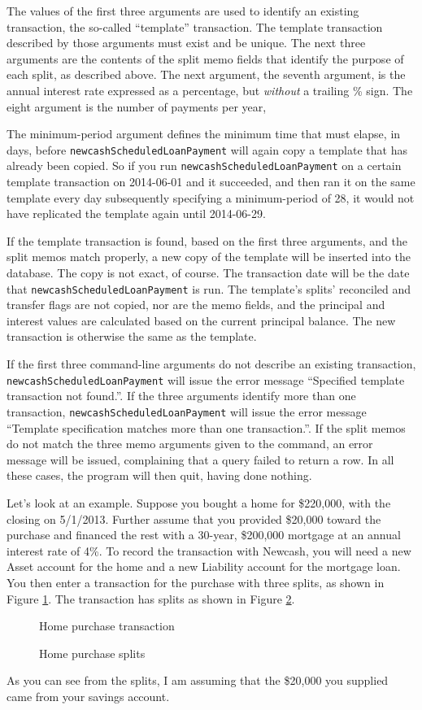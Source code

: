 \documentclass{report}
\newcommand{\graphicsfig}[5]{
\begin{figure}[#5]
\begin{center}
\resizebox{#1}{!}{\texttt{[image: \#2]}}
\end{center}
\caption{#3}
\label{#4}
\end{figure}
}
\begin{document}
The values of the first three arguments are used to identify an existing transaction, the so-called ``template'' transaction. The template transaction described by those arguments must exist and be unique. The next three arguments are the contents of the split memo fields that identify the purpose of each split, as described above. The next argument, the seventh argument, is the annual interest rate expressed as a percentage, but \emph{without} a trailing \% sign. The eight argument is the number of payments per year,

The minimum-period argument defines the minimum time that must elapse, in days, before \verb|newcashScheduledLoanPayment| will again copy a template that has already been copied. So if you run \verb|newcashScheduledLoanPayment| on a certain template transaction on 2014-06-01 and it succeeded, and then ran it on the same template every day subsequently specifying a minimum-period of 28, it would not have replicated the template again until 2014-06-29.

If the template transaction is found, based on the first three arguments, and the split memos match properly, a new copy of the template will be inserted into the database. The copy is not exact, of course. The transaction date will be the date that \verb|newcashScheduledLoanPayment| is run. The template's splits' reconciled and transfer flags are not copied, nor are the memo fields, and the principal and interest values are calculated based on the current principal balance. The new transaction is otherwise the same as the template.

If the first three command-line arguments do not describe an existing transaction, \verb|newcashScheduledLoanPayment| will issue the error message ``Specified template transaction not found.''. If the three arguments identify more than one transaction, \verb|newcashScheduledLoanPayment| will issue the error message ``Template specification matches more than one transaction.''. If the split memos do not match the three memo arguments given to the command, an error message will be issued, complaining that a query failed to return a row. In all these cases, the program will then quit, having done nothing.

Let's look at an example. Suppose you bought a home for \$220,000, with the closing on 5/1/2013. Further assume that you provided \$20,000 toward the purchase and financed the rest with a 30-year, \$200,000 mortgage at an annual interest rate of 4\%. To record the transaction with Newcash, you will need a new Asset account for the home and a new Liability account for the mortgage loan. You then enter a transaction for the purchase with three splits, as shown in Figure \ref{Home purchase transaction}. The transaction has splits as shown in Figure \ref{Home purchase splits}.
\graphicsfig{5in}{figures/home_purchase_transaction.png}{Home purchase transaction}{Home purchase transaction}{}
\graphicsfig{5in}{figures/home_purchase_splits.png}{Home purchase splits}{Home purchase splits}{}
As you can see from the splits,  I am assuming that the \$20,000 you supplied came from your savings account.
\end{document}
